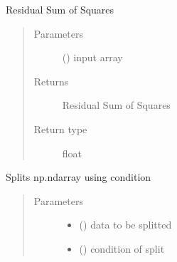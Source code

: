 \documentclass[letterpaper,10pt,english]{sphinxmanual}
\begin{document}
\begin{fulllineitems}

\begin{fulllineitems}
\label{\detokenize{tree:random_forest.tree.Node.rss}}
Residual Sum of Squares
\begin{quote}\begin{description}
\item[{Parameters}] \leavevmode
{} () \textendash{} input array

\item[{Returns}] \leavevmode
Residual Sum of Squares

\item[{Return type}] \leavevmode
float

\end{description}\end{quote}

\end{fulllineitems}


\begin{fulllineitems}
\label{\detokenize{tree:random_forest.tree.Node.split_data_on_value}}
Splits np.ndarray using condition
\begin{quote}\begin{description}
\item[{Parameters}] \leavevmode\begin{itemize}
\item {} 
 () \textendash{} data to be splitted

\item {} 
 ({\hyperref[\detokenize{tree:random_forest.tree.Condition}]{}}) \textendash{} condition of split


\end{itemize}
\end{description}
\end{quote}
\end{fulllineitems}
\end{fulllineitems}
\end{document}
